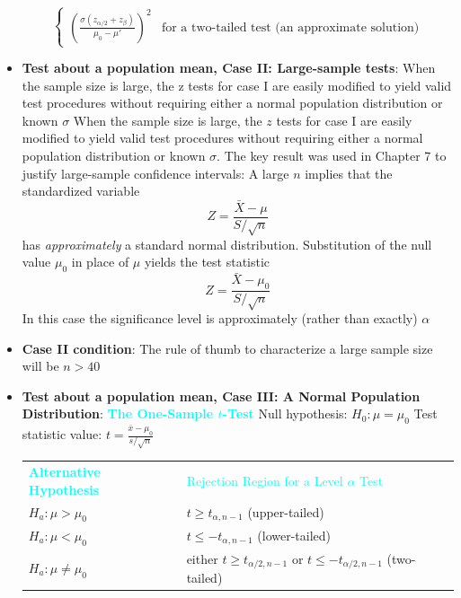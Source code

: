 \documentclass{report}
\begin{document}
\begin{itemize}
\[\begin{cases}
            \left( \frac{\sigma (z_{\alpha/2} + z_\beta)}{\mu_0 - \mu'} \right)^2 & \text{for a two-tailed test (an approximate solution)}
        \end{cases}
    \]
    \item \textbf{Test about a population mean, Case II: Large-sample tests}:
        When the sample size is large, the z tests for case I are easily modified to yield valid test procedures without requiring either a normal population distribution or known $\sigma$
        \bigbreak \noindent 
        When the sample size is large, the \( z \) tests for case I are easily modified to yield valid test procedures without requiring either a normal population distribution or known \( \sigma \). The key result was used in Chapter 7 to justify large-sample confidence intervals: A large \( n \) implies that the standardized variable
        \[
            Z = \frac{\bar{X} - \mu}{S/\sqrt{n}}
        \]
        has \textit{approximately} a standard normal distribution. Substitution of the null value \( \mu_0 \) in place of \( \mu \) yields the test statistic
        \[
            Z = \frac{\bar{X} - \mu_0}{S/\sqrt{n}}
        \]
        \bigbreak \noindent 
        In this case the significance level is approximately (rather than exactly) $\alpha$
    \item \textbf{Case II condition}: The rule of thumb to characterize a large sample size will be $n > 40$
        \pagebreak \bigbreak \noindent 
    \item \textbf{Test about a population mean, Case III: A Normal Population Distribution}:
        \bigbreak \noindent 
        \textbf{\textcolor{cyan}{The One-Sample \( t \)-Test}}
        \bigbreak \noindent 
        Null hypothesis: \( H_0: \mu = \mu_0 \)
        \bigbreak \noindent 
        Test statistic value: \( t = \frac{\bar{x} - \mu_0}{s/\sqrt{n}} \)
        \bigbreak \noindent 
        \begin{tabular}{>{\bfseries}l l}
            \noindent \textcolor{cyan}{Alternative Hypothesis} & \textcolor{cyan}{Rejection Region for a Level \( \alpha \) Test} \\
            $H_a: \mu > \mu_0$ & $t \ge t_{\alpha, n-1}$ (upper-tailed) \\
            $H_a: \mu < \mu_0$ & $t \le -t_{\alpha, n-1}$ (lower-tailed) \\
            $H_a: \mu \neq \mu_0$ & either $t \ge t_{\alpha/2, n-1}$ or $t \le -t_{\alpha/2, n-1}$ (two-tailed) \\
        \end{tabular}

\end{itemize}
\end{document}
